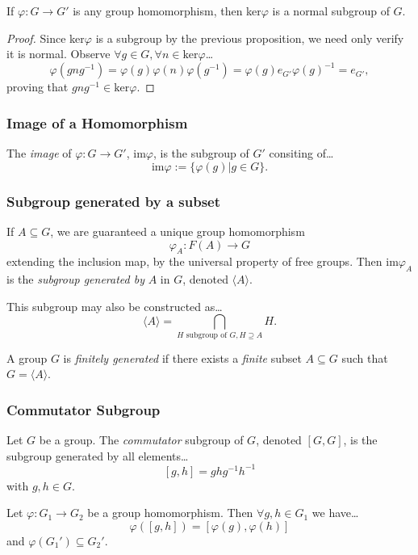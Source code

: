 \begin{lemma}
If $\varphi: G \rightarrow G'$ is any group homomorphism, then ker$\varphi$ is a normal subgroup of $G$.
\end{lemma}

\begin{proof}
Since ker$\varphi$ is a subgroup by the previous proposition, we need only verify it is normal. Observe $\forall g \in G, \forall n \in \textrm{ker}\varphi$\dots
$$\varphi(gng^{-1}) = \varphi(g)\varphi(n)\varphi(g^{-1}) = \varphi(g)e_{G'}\varphi(g)^{-1} = e_{G'},$$
proving that $gng^{-1} \in \textrm{ker}\varphi$.
\end{proof}

\subsubsection{Image of a Homomorphism}\label{imagehomomorphism}
The \emph{image} of $\varphi : G \rightarrow G'$, im$\varphi$, is the subgroup of $G'$ consiting of\dots
$$\textrm{im}\varphi := \{ \varphi(g) | g \in G \}.$$

\subsubsection{Subgroup generated by a subset}\label{subgroupgeneratedbysubset}
If $A \subseteq G$, we are guaranteed a unique group homomorphism
$$\varphi_A : F(A) \rightarrow G$$
extending the inclusion map, by the universal property of free groups. Then im$\varphi_A$ is the
\emph{subgroup generated by} $A$ in $G$, denoted $\langle A \rangle$.\newline

\noindent This subgroup may also be constructed as\dots
$$\langle A \rangle = \bigcap_{H \textrm{ subgroup of } G,H \supseteq A} H.$$

\label{finitelygenerated}
A group $G$ is \emph{finitely generated} if there exists a \emph{finite} subset $A \subseteq G$ such that $G = \langle A \rangle$.

\subsubsection{Commutator Subgroup}\label{commutatorsubgroup}
Let $G$ be a group. The \emph{commutator} subgroup of $G$, denoted $[G,G]$, is the subgroup generated by all elements\dots
$$[g,h] = ghg^{-1}h^{-1}$$
with $g,h \in G.$

\begin{lemma}
Let $\varphi : G_1 \rightarrow G_2$ be a group homomorphism. Then $\forall g, h \in G_1$ we have\dots
$$\varphi([g,h]) = [\varphi(g), \varphi(h)]$$
and $\varphi(G_1') \subseteq G_2'.$
\end{lemma}

